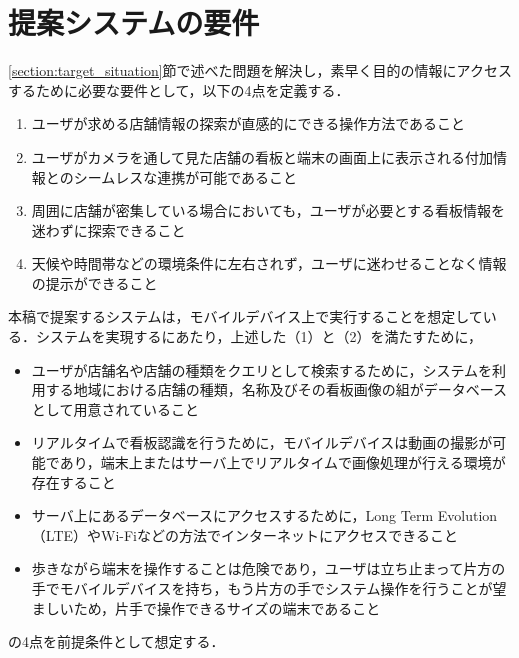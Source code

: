 \section{提案システムの要件}
  \label{subsection:requirement}
  \ref{section:target_situation}節で述べた問題を解決し，素早く目的の情報にアクセスするために必要な要件として，以下の4点を定義する．
  \begin{enumerate}
    \item ユーザが求める店舗情報の探索が直感的にできる操作方法であること
    \item ユーザがカメラを通して見た店舗の看板と端末の画面上に表示される付加情報とのシームレスな連携が可能であること
    \item 周囲に店舗が密集している場合においても，ユーザが必要とする看板情報を迷わずに探索できること
    \item 天候や時間帯などの環境条件に左右されず，ユーザに迷わせることなく情報の提示ができること
  \end{enumerate}
  本稿で提案するシステムは，モバイルデバイス上で実行することを想定している．システムを実現するにあたり，上述した（1）と（2）を満たすために，
  \begin{itemize}
    \item ユーザが店舗名や店舗の種類をクエリとして検索するために，システムを利用する地域における店舗の種類，名称及びその看板画像の組がデータベースとして用意されていること
    \item リアルタイムで看板認識を行うために，モバイルデバイスは動画の撮影が可能であり，端末上またはサーバ上でリアルタイムで画像処理が行える環境が存在すること
    \item サーバ上にあるデータベースにアクセスするために，Long Term Evolution（LTE）やWi-Fiなどの方法でインターネットにアクセスできること
    \item 歩きながら端末を操作することは危険であり，ユーザは立ち止まって片方の手でモバイルデバイスを持ち，もう片方の手でシステム操作を行うことが望ましいため，片手で操作できるサイズの端末であること
  \end{itemize}
  の4点を前提条件として想定する．

